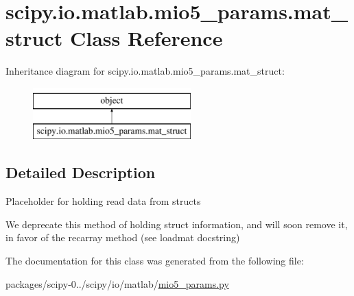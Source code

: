\hypertarget{classscipy_1_1io_1_1matlab_1_1mio5__params_1_1mat__struct}{}\section{scipy.\+io.\+matlab.\+mio5\+\_\+params.\+mat\+\_\+struct Class Reference}
\label{classscipy_1_1io_1_1matlab_1_1mio5__params_1_1mat__struct}
Inheritance diagram for scipy.\+io.\+matlab.\+mio5\+\_\+params.\+mat\+\_\+struct\+:\begin{figure}[H]
\begin{center}
\leavevmode
\includegraphics[height=2.000000cm]{classscipy_1_1io_1_1matlab_1_1mio5__params_1_1mat__struct}
\end{center}
\end{figure}


\subsection{Detailed Description}
\begin{DoxyVerb}Placeholder for holding read data from structs

We deprecate this method of holding struct information, and will
soon remove it, in favor of the recarray method (see loadmat
docstring)
\end{DoxyVerb}
 

The documentation for this class was generated from the following file\+:\begin{DoxyCompactItemize}
\item 
packages/scipy-\/0../scipy/io/matlab/\hyperlink{mio5__params_8py}{mio5\+\_\+params.\+py}\end{DoxyCompactItemize}
